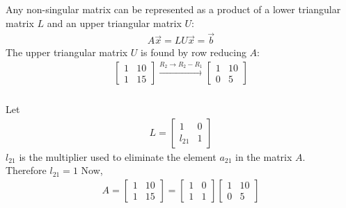 \documentclass{beamer}
\begin{document}
\begin{frame}
\frametitle{}
Any non-singular matrix can be represented as a product of a lower triangular matrix \( L \) and an upper triangular matrix \( U \):
\begin{align}
    A\vec{x} = LU\vec{x} = \vec{b}
\end{align}
The upper triangular matrix \( U \) is found by row reducing \( A \):
\begin{align}
    \begin{bmatrix}1 & 10\\1 & 15\end{bmatrix} \xrightarrow{R_2 \to R_2 - R_1} \begin{bmatrix}1 & 10\\0 & 5\end{bmatrix}
\end{align}
\end{frame}
\begin{frame}
\frametitle{}    
Let 
\begin{align}
    L = \begin{bmatrix}1 & 0\\l_{21} & 1\end{bmatrix}
\end{align}
\( l_{21} \) is the multiplier used to eliminate the element \( a_{21} \) in the matrix \( A \). \\
Therefore $l_{21} = 1$
\newline
Now,
\begin{align}
   A=\begin{bmatrix}1 & 10\\1 & 15\end{bmatrix} = \begin{bmatrix}1 & 0\\1 & 1\end{bmatrix}\begin{bmatrix}1 & 10\\0 & 5\end{bmatrix}
\end{align}
\end{frame}
\end{document}
